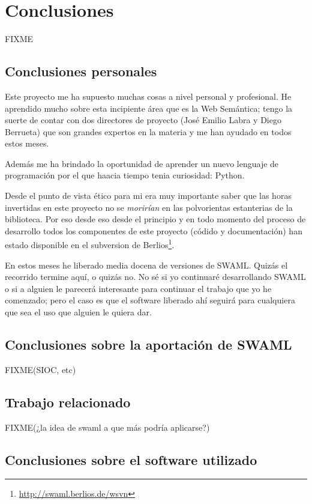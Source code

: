 
\chapter{Conclusiones}

FIXME

\section{Conclusiones personales}

Este proyecto me ha supuesto muchas cosas a nivel personal y profesional. He
aprendido mucho sobre esta incipiente área que es la Web Semántica; tengo la
suerte de contar con dos directores de proyecto (José Emilio Labra y Diego
Berrueta) que son grandes expertos en la materia y me han ayudado en todos 
estos meses.

Además me ha brindado la oportunidad de aprender un nuevo lenguaje de programación 
por el que haacia tiempo tenia curiosidad: Python.

Desde el punto de vista ético para mi era muy importante saber que las horas
invertidas en este proyecto no se \emph{morirían} en las polvorientas estanterias
de la biblioteca. Por eso desde eso desde el principio y en todo momento del
proceso de desarrollo todos los componentes de este proyecto (códido y 
documentación) han estado disponible en el subversion de 
Berlios\footnote{\url{http://swaml.berlios.de/wsvn}}.

En estos meses he liberado media docena de versiones de SWAML. Quizás el recorrido
termine aquí, o quizás no. No sé si yo continuaré desarrollando SWAML o si a alguien
le parecerá interesante para continuar el trabajo que yo he comenzado; pero el caso
es que el software liberado ahí seguirá para cualquiera que sea el uso que alguien
le quiera dar.

\section{Conclusiones sobre la aportación de SWAML}

FIXME(SIOC, etc)

\section{Trabajo relacionado}

FIXME(¿la idea de swaml a que más podría aplicarse?)

\section{Conclusiones sobre el software utilizado}

